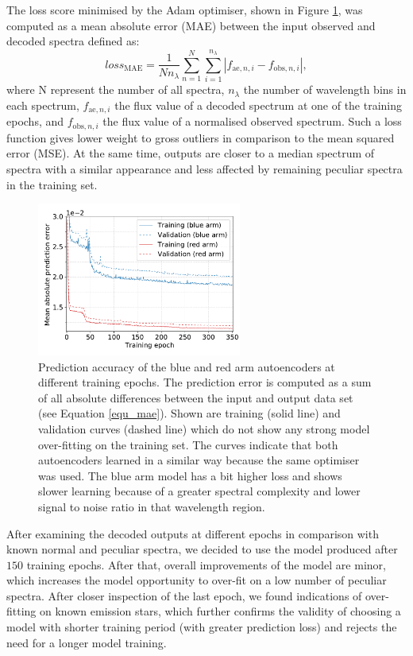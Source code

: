 The loss score minimised by the Adam optimiser, shown in Figure \ref{fig:trainann}, was computed as a mean absolute error (MAE) between the input observed and decoded spectra defined as:
\begin{equation}
\label{equ_mae}
loss_\mathrm{MAE} = \frac{1}{N n_\lambda} \sum_{n=1}^{N}\sum_{i=1}^{n_\lambda}\left|f_{\mathrm{ae}, n, i} - f_{\mathrm{obs}, n, i}\right|,
\end{equation}
where N represent the number of all spectra, $n_\lambda$ the number of wavelength bins in each spectrum,  $f_{\mathrm{ae}, n, i}$ the flux value of a decoded spectrum at one of the training epochs, and $f_{\mathrm{obs}, n, i}$ the flux value of a normalised observed spectrum. Such a loss function gives lower weight to gross outliers in comparison to the mean squared error (MSE). At the same time, outputs are closer to a median spectrum of spectra with a similar appearance and less affected by remaining peculiar spectra in the training set. 

\begin{figure}
	\centering
	\includegraphics[width=0.6\textwidth]{ann_network_loss_ccd13.pdf}
	\caption{Prediction accuracy of the blue and red arm autoencoders at different training epochs. The prediction error is computed as a sum of all absolute differences between the input and output data set (see Equation \ref{equ_mae}). Shown are training (solid line) and validation curves (dashed line) which do not show any strong model over-fitting on the training set. The curves indicate that both autoencoders learned in a similar way because the same optimiser was used. The blue arm model has a bit higher loss and shows slower learning because of a greater spectral complexity and lower signal to noise ratio in that wavelength region.}
	\label{fig:trainann}
\end{figure}

After examining the decoded outputs at different epochs in comparison with known normal and peculiar spectra, we decided to use the model produced after $150$ training epochs. After that, overall improvements of the model are minor, which increases the model opportunity to over-fit on a low number of peculiar spectra. After closer inspection of the last epoch, we found indications of over-fitting on known emission stars, which further confirms the validity of choosing a model with shorter training period (with greater prediction loss) and rejects the need for a longer model training.

